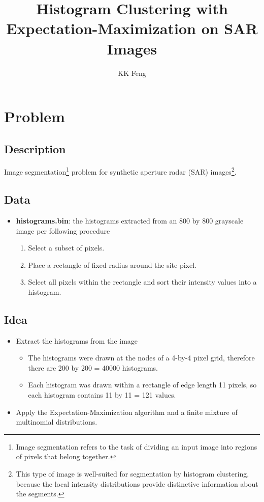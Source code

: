 \documentclass[letterpaper,hidelinks]{article}
\author{KK Feng}
\title{Histogram Clustering with Expectation-Maximization on SAR Images}
\date{}
\numberwithin{equation}{section}
\begin{document}
\maketitle
\section{Problem}
\subsection{Description}
Image segmentation\footnote{Image segmentation refers to the task of dividing an input image into regions of pixels that belong together.} problem for synthetic aperture radar (SAR) images\footnote{This type of image is well-suited for segmentation by histogram clustering, because the local intensity distributions provide distinctive information about the segments.}.
\subsection{Data}
\begin{itemize}
\item \textbf{histograms.bin}: the histograms extracted from an 800 by 800 grayscale image per following procedure
\begin{enumerate}
\item Select a subset of pixels.
\item Place a rectangle of fixed radius around the site pixel.
\item Select all pixels within the rectangle and sort their intensity values into a histogram.
\end{enumerate}
\end{itemize}
\subsection{Idea}
\begin{itemize}
\item Extract the histograms from the image
\begin{itemize}
\item The histograms were drawn at the nodes of a 4-by-4 pixel grid, therefore there are 200 by 200 = 40000 histograms. 
\item Each histogram was drawn within a rectangle of edge length 11 pixels, so each histogram contains 11 by 11 = 121 values.
\end{itemize}
\item Apply the Expectation-Maximization algorithm and a finite mixture of multinomial distributions.
\end{itemize}
\end{document}
